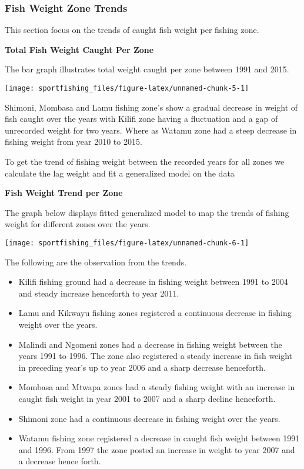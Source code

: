 \documentclass[
]{article}
\providecommand{\tightlist}{%
  \setlength{\itemsep}{0pt}\setlength{\parskip}{0pt}}
\begin{document}
\newpage

\subsubsection{Fish Weight Zone Trends}\label{fish-weight-zone-trends}

This section focus on the trends of caught fish weight per fishing zone.

\textbf{Total Fish Weight Caught Per Zone}

The bar graph illustrates total weight caught per zone between 1991 and
2015.

\begin{center}\texttt{[image: sportfishing\_files/figure-latex/unnamed-chunk-5-1]} \end{center}

Shimoni, Mombasa and Lamu fishing zone's show a gradual decrease in
weight of fish caught over the years with Kilifi zone having a
fluctuation and a gap of unrecorded weight for two years. Where as
Watamu zone had a steep decrease in fishing weight from year 2010 to
2015.

To get the trend of fishing weight between the recorded years for all
zones we calculate the lag weight and fit a generalized model on the
data

\newpage

\textbf{Fish Weight Trend per Zone}

The graph below displays fitted generalized model to map the trends of
fishing weight for different zones over the years.

\begin{center}\texttt{[image: sportfishing\_files/figure-latex/unnamed-chunk-6-1]} \end{center}

The following are the observation from the trends.

\begin{itemize}
\tightlist
\item
  Kilifi fishing ground had a decrease in fishing weight between 1991 to
  2004 and steady increase henceforth to year 2011.
\item
  Lamu and Kikwayu fishing zones registered a continuous decrease in
  fishing weight over the years.
\item
  Malindi and Ngomeni zones had a decrease in fishing weight between the
  years 1991 to 1996. The zone also registered a steady increase in fish
  weight in preceding year's up to year 2006 and a sharp decrease
  henceforth.
\item
  Mombasa and Mtwapa zones had a steady fishing weight with an increase
  in caught fish weight in year 2001 to 2007 and a sharp decline
  henceforth.
\item
  Shimoni zone had a continuous decrease in fishing weight over the
  years.
\item
  Watamu fishing zone registered a decrease in caught fish weight
  between 1991 and 1996. From 1997 the zone posted an increase in weight
  to year 2007 and a decrease hence forth.
\end{itemize}
\end{document}
